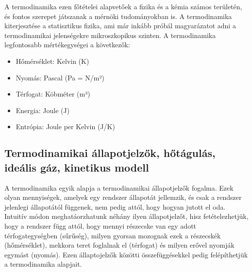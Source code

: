 \documentclass[a4paper,12pt]{article}
\begin{document}
A termodinamika ezen főtételei alapvetőek a fizika és a kémia számos területén, és fontos szerepet játszanak a mérnöki tudományokban is. A termodinamika kiterjesztése a statisztikus fizika, ami már inkább próbál magyarázatot adni a termodinamikai jelenségekre mikroszkopikus szinten.
A termodinamika legfontosabb mértékegységei a következők:
\begin{itemize}
    \item Hőmérséklet: Kelvin (K)
    \item Nyomás: Pascal (Pa = N/m²)
    \item Térfogat: Köbméter (m³)
    \item Energia: Joule (J)
    \item Entrópia: Joule per Kelvin (J/K)
\end{itemize}

\subsection{Termodinamikai állapotjelzők, hőtágulás, ideális gáz, kinetikus modell}
A termodinamika egyik alapja a termodinamikai állapotjelzők fogalma. Ezek olyan mennyiségek, amelyek egy rendszer állapotát jellemzik, és csak a rendszer jelenlegi állapotától függenek,
nem pedig attól, hogy hogyan jutott el oda. Intuitív módon meghatáorzhatunk néhány ilyen állapotjelzőt, hisz fetételezhetjük, hogy a rendszer függ attól, hogy mennyi 
részecske van egy adott térfogategységben (sűrűség), milyen gyorsan mozognak ezek a részecskék (hőmérséklet), mekkora teret foglalnak el (térfogat) és milyen erővel nyomják egymást (nyomás).
Ezen állaptojelzők közötti összefüggésekkel pedig felépíthetjük a termodinamika alapjait. 
\end{document}
